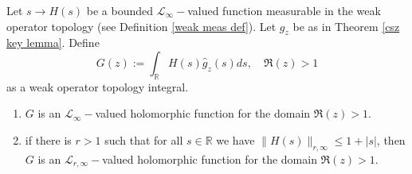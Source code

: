     \begin{lem}\label{g abstract analytic lemma} 
        Let $s\to H(s)$ be a bounded $\mathcal{L}_{\infty}-$valued function measurable in the weak operator topology (see Definition \ref{weak meas def}). { Let $g_z$ be as in Theorem \ref{csz key lemma}}. Define
        $$G(z) := \int_{\mathbb{R}}H(s)\widehat{g}_z(s)ds,\quad \Re(z)>1$$
        { as a weak operator topology integral.}
        \begin{enumerate}[{\rm (i)}]
            \item\label{gaba} $G$ is an $\mathcal{L}_{\infty}-$valued holomorphic function for the domain $\Re(z)>1.$
            \item\label{gabb} if there is $r > 1$ such that for all $s \in \mathbb{R}$ we have $\|H(s)\|_{r,\infty}\leq 1+|s|$, then $G$ is an $\mathcal{L}_{r,\infty}-$valued holomorphic function 
                            for the domain $\Re(z)>1.$
        \end{enumerate}
    \end{lem}
